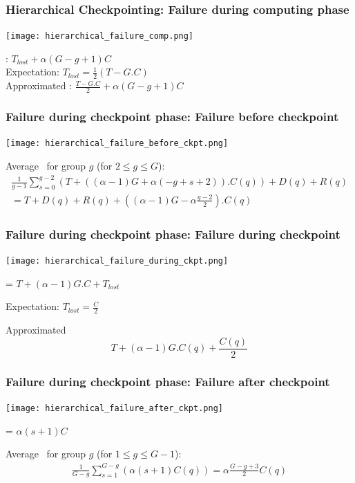 \begin{frame}
  \frametitle{Hierarchical Checkpointing: Failure during computing phase}

  \texttt{[image: hierarchical\_failure\_comp.png]}

  \Overhead: $T_{lost}+\alpha(G-g+1)C$\\
  Expectation: $T_{lost}= \frac{1}{2}(T-G.C)$\\
  Approximated \Overhead: $\frac{T-G.C}{2}+\alpha(G-g+1)C$
  
\end{frame}

\begin{frame}
  \frametitle{Failure during checkpoint phase: Failure before checkpoint}

  \texttt{[image: hierarchical\_failure\_before\_ckpt.png]}

  Average \Overhead~for group $g$ (for $2 \leq g \leq G$):
    \begin{multline*}
      \frac{1}{g-1}\sum_{s=0}^{g-2} \left(T +
        ((\alpha-1)G+\alpha(-g+s+2)).C(q)\right) + D(q) + R(q)\\
      = T + D(q)+R(q)+\left((\alpha-1)G-\alpha\frac{g-2}{2}\right).C(q)
    \end{multline*}
  
\end{frame}

\begin{frame}
  \frametitle{Failure during checkpoint phase: Failure during checkpoint}

  \texttt{[image: hierarchical\_failure\_during\_ckpt.png]}

  \Overhead = $T+(\alpha-1)G.C + T_{lost}$
  
  Expectation: $T_{lost} = \frac{C}{2}$

  Approximated \Overhead  $$T+(\alpha-1)G.C(q)+\frac{C(q)}{2}$$
  
\end{frame}

\begin{frame}
  \frametitle{Failure during checkpoint phase: Failure after checkpoint}

  \texttt{[image: hierarchical\_failure\_after\_ckpt.png]}

  \Overhead = $ \alpha(s+1)C$

  Average \Overhead~for group $g$ (for $1 \leq g \leq G-1$): 
  \begin{multline*}
    \frac{1}{G-g}\sum_{s=1}^{G-g}\left(\alpha(s+1)C(q)\right)= \alpha\frac{G-g+3}{2}C(q)
  \end{multline*}
  
\end{frame}

